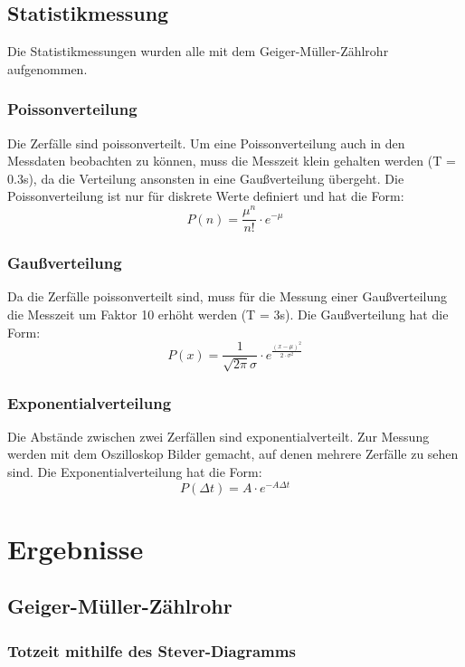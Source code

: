 \documentclass[12pt,a4paper]{article}
\begin{document}
\subsection{Statistikmessung}
Die Statistikmessungen wurden alle mit dem Geiger-Müller-Zählrohr aufgenommen.
\subsubsection{Poissonverteilung}
Die Zerfälle sind poissonverteilt. Um eine Poissonverteilung auch in den Messdaten beobachten zu können, muss die Messzeit klein gehalten werden (T = 0.3s), da die Verteilung ansonsten in eine Gaußverteilung übergeht. Die Poissonverteilung ist nur für diskrete Werte definiert und hat die Form:
\begin{equation}
P(n) = \dfrac{\mu ^n}{n!} \cdot e^{-\mu}
\end{equation}
\subsubsection{Gaußverteilung}
Da die Zerfälle poissonverteilt sind, muss für die Messung einer Gaußverteilung die Messzeit um Faktor 10 erhöht werden (T = 3s). Die Gaußverteilung hat die Form:
\begin{equation}
P(x) = \dfrac{1}{\sqrt{2 \pi} \sigma} \cdot e^{\frac{(x - \mu)^2}{2 \cdot \sigma ^2}}
\end{equation}
\subsubsection{Exponentialverteilung}
Die Abstände zwischen zwei Zerfällen sind exponentialverteilt. Zur Messung werden mit dem Oszilloskop Bilder gemacht, auf denen mehrere Zerfälle zu sehen sind. Die Exponentialverteilung hat die Form:
\begin{equation}
P(\Delta t) = A \cdot e^{- A \Delta t}
\end{equation}

\section{Ergebnisse}
\subsection{Geiger-Müller-Zählrohr}

\subsubsection{Totzeit mithilfe des Stever-Diagramms}
\end{document}
